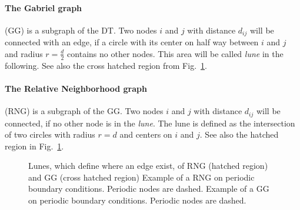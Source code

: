     \paragraph{The Gabriel graph} (GG) \cite{Gabriel1969} is a subgraph of the
    DT. Two nodes \(i\) and \(j\) with distance
    \(d_{ij}\) will be connected with an edge, if a circle with its
    center on half way between \(i\) and \(j\) and radius
    \(r = \frac d 2\) contains no other nodes. This area will be
    called \emph{lune} in the following. See also the cross hatched region
    from Fig.\ \ref{fig:lunes}.\\
    \paragraph{The Relative Neighborhood graph} (RNG) \cite{Toussaint1980} is a
    subgraph of the GG. Two nodes \(i\) and \(j\) with
    distance \(d_{ij}\) will be connected, if no other node is in the
    \emph{lune}. The lune is defined as the intersection of two
    circles with radius \(r = d\) and centers on \(i\) and \(j\).
    See also the hatched region in Fig.\ \ref{fig:lunes}.
    \begin{figure}[htbp]
        \centering
        \caption[Gabriel - and Relative Neighborhood Graph]
        {
             Lunes, which define where an edge
                exist, of RNG (hatched region) and GG (cross hatched region)
             Example of a RNG on periodic
                boundary conditions. Periodic nodes are dashed.
             Example of a GG on
                periodic boundary conditions. Periodic nodes are dashed.
        }
        \label{fig:lunes}
    \end{figure}\\
